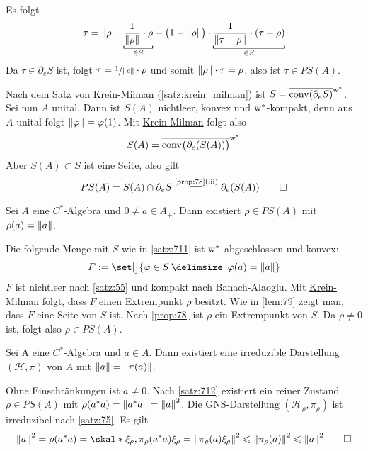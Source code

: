 \begin{beweis}
\begin{itemize}
		Es folgt
		\[
			\tau = \norm*{\rho} \cdot \Underbracket{\frac{1}{\norm*{\rho}} \cdot \rho}{\in S} + \enbrace[\big]{1- \norm*{\rho}} \cdot \Underbracket{\frac{1}{\norm*{\tau - \rho}} \cdot (\tau - \rho)}{\in S}  
		\]
		Da $\tau \in \partial_e S$ ist, folgt $\tau = \sfrac{1}{\norm*{\rho}} \cdot \rho$ und somit $\norm*{\rho} \cdot \tau =\rho$, also ist $\tau \in PS(A)$.
	\end{itemize}
	Nach dem \hyperref[satz:krein_milman]{Satz von Krein-Milman (\ref*{satz:krein_milman})} ist $S= \overline{\conv(\partial_e S)}^{\raisemath{-.4ex}{\w^*}}$.
	Sei nun $A$ unital.
	Dann ist $S(A)$ nichtleer, konvex und $\w^*$-kompakt, denn aus $A$ unital folgt $\norm*{\varphi}=\varphi(1)$.
	Mit \hyperref[satz:krein_milman]{Krein-Milman} folgt also
	\[
		S(A) = \overline{\conv \enbrace[\big]{\partial_e \enbrace*{S(A)}}}^{\w^*}
	\]
	Aber $S(A) \subset S$ ist eine Seite, also gilt 
	\[
		PS(A) =S(A) \cap \partial_e S \StackText{\ref{prop:78}(iii)}{=\joinrel=} \partial_e \enbrace*{S(A)} \qedhere
	\]
\end{beweis}

\begin{satz}[label=satz:712]
	Sei $A$ eine $C^*$-Algebra und $0\neq a \in A_+$.
	Dann existiert $\rho \in PS(A)$ mit $\rho(a)=\norm*{a}$.
\end{satz}
\begin{beweis}
	Die folgende Menge mit $S$ wie in \autoref{satz:711} ist $\w^*$-abgeschlossen und konvex:
	\[
		F := \set[\big]{\varphi \in S \given \varphi(a)=\norm*{a}}
	\]
	$F$ ist nichtleer nach \autoref{satz:55} und kompakt nach Banach-Alaoglu.
	Mit \hyperref[satz:krein_milman]{Krein-Milman} folgt, dass $F$ einen Extrempunkt $\rho$ besitzt.
	Wie in \autoref{lem:79} zeigt man, dass $F$ eine Seite von $S$ ist.
	Nach \autoref{prop:78} ist $\rho$ ein Extrempunkt von $S$.
	Da $\rho\neq0$ ist, folgt also $\rho \in PS(A)$.
\end{beweis}

\begin{korollar}[label=korr:713]
	Sei A eine $C^*$-Algebra und $a \in A$.
	Dann existiert eine irreduzible Darstellung $(\mathcal{H},\pi)$ von $A$ mit $\norm*{a}= \norm*{\pi(a)}$.
\end{korollar}
\begin{beweis}
	Ohne Einschränkungen ist $a \neq 0$.
	Nach \autoref{satz:712} existiert ein reiner Zustand $\rho \in PS(A)$ mit $\rho(a^*a)=\norm*{a^*a}=\norm*{a}^2$.
	Die GNS-Darstellung $(\mathcal{H}_\rho,\pi_\rho)$ ist irreduzibel nach \autoref{satz:75}.
	Es gilt
	\[
		\norm*{a}^2 = \rho(a^*a) = \skal*{\xi_\rho, \pi_\rho(a^*a)\xi_\rho} = \norm*{\pi_\rho(a) \xi_\rho}^2 \le \norm*{\pi_\rho(a)}^2 \le \norm*{a}^2 \qedhere
	\]
\end{beweis}

